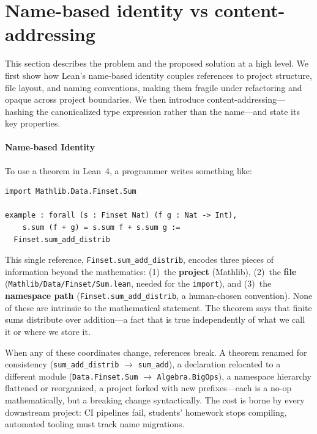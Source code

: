 
\section{Name-based identity vs content-addressing}

This section describes the problem and the proposed solution at a
  high level.  We first show how Lean's name-based identity couples
  references to project structure, file layout, and naming conventions,
  making them fragile under refactoring and opaque across project
  boundaries.  We then introduce content-addressing---hashing the
  canonicalized type expression rather than the name---and state its
  key properties.

\paragraph{Name-based Identity}

To use a theorem in Lean~4, a programmer writes something like:

\begin{lstlisting}[caption={Using a theorem by its fully qualified name}]
import Mathlib.Data.Finset.Sum

example : forall (s : Finset Nat) (f g : Nat -> Int),
    s.sum (f + g) = s.sum f + s.sum g :=
  Finset.sum_add_distrib
\end{lstlisting}

This single reference, \texttt{Finset.sum\_add\_distrib}, encodes three
pieces of information beyond the mathematics: (1)~the \textbf{project}
(Mathlib), (2)~the \textbf{file}
(\texttt{Mathlib/Data/Finset/Sum.lean}, needed for the \texttt{import}),
and (3)~the \textbf{namespace path}
(\texttt{Finset.sum\_add\_distrib}, a human-chosen convention).
None of these are intrinsic to the mathematical statement.  The theorem
says that finite sums distribute over addition---a fact that is true
independently of what we call it or where we store it.

When any of these coordinates change, references break.  A theorem
renamed for consistency (\texttt{sum\_add\_distrib} $\to$
\texttt{sum\_add}), a declaration relocated to a different module
(\texttt{Data.Finset.Sum} $\to$ \texttt{Algebra.BigOps}), a namespace
hierarchy flattened or reorganized, a project forked with new
prefixes---each is a no-op mathematically, but a breaking change
syntactically.  The cost is borne by every downstream project: CI
pipelines fail, students' homework stops compiling, automated tooling
must track name migrations.

